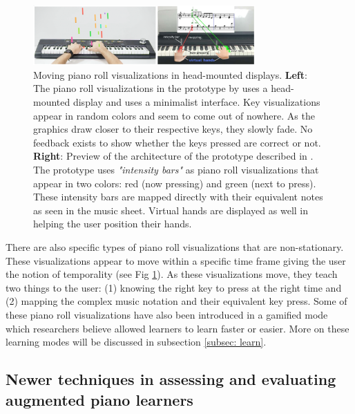 \documentclass[sigchi, review]{acmart}
\begin{document}
\begin{figure}[t]
    \centering
    \includegraphics[width=8.5cm]{figures/caitrujano.png}
    \caption{Moving piano roll visualizations in head-mounted displays. \textbf{Left}: The piano roll visualizations in the prototype by  \cite{trujano2018arpiano} uses a head-mounted display and uses a minimalist interface. Key visualizations appear in random colors and seem to come out of nowhere. As the graphics draw closer to their respective keys, they slowly fade. No feedback exists to show whether the keys pressed are correct or not.  \textbf{Right}: Preview of the architecture of the prototype described in \cite{cai2019design}. The prototype uses \textit{"intensity bars"} as piano roll visualizations that appear in two colors: red (now pressing) and green (next to press). These intensity bars are mapped directly with their equivalent notes as seen in the music sheet. Virtual hands are displayed as well in helping the user position their hands. }
    \label{fig:caitrujano}
\end{figure}

There are also specific types of piano roll visualizations that are non-stationary. These visualizations appear to move within a specific time frame giving the user the notion of temporality (see Fig \ref{fig:caitrujano}). As these visualizations move, they teach two things to the user: (1) knowing the right key to press at the right time and (2) mapping the complex music notation and their equivalent key press. Some of these piano roll visualizations have also been introduced in a gamified mode \cite{Weing:2013:PEI:2494091.2494113} which researchers believe allowed learners to learn faster or easier. More on these learning modes will be discussed in subsection \ref{subsec: learn}. 




\subsection{Newer techniques in assessing and evaluating augmented piano learners}
\label{subsec: eval}
\end{document}
